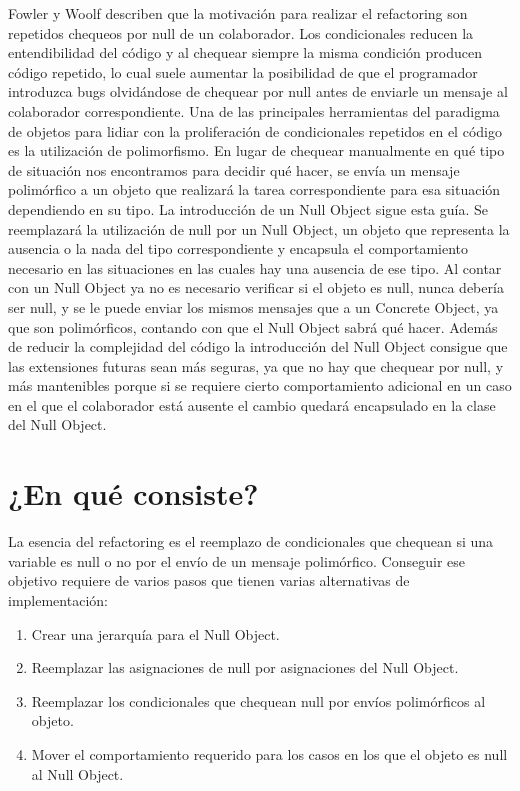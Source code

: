 Fowler y Woolf describen que la motivación para realizar el refactoring son repetidos chequeos por
null de un colaborador. Los condicionales reducen la entendibilidad del código y al chequear siempre
la misma condición producen código repetido, lo cual suele aumentar la posibilidad de que el
programador introduzca bugs olvidándose de chequear por null antes de enviarle un mensaje al
colaborador correspondiente. Una de las principales herramientas del paradigma de objetos para
lidiar con la proliferación de condicionales repetidos en el código es la utilización de
polimorfismo. En lugar de chequear manualmente en qué tipo de situación nos encontramos para decidir
qué hacer, se envía un mensaje polimórfico a un objeto que realizará la tarea correspondiente para
esa situación dependiendo en su tipo. La introducción de un Null Object sigue esta guía. Se
reemplazará la utilización de null por un Null Object, un objeto que representa la ausencia o la
nada del tipo correspondiente y encapsula el comportamiento necesario en las situaciones en las
cuales hay una ausencia de ese tipo. Al contar con un Null Object ya no es necesario verificar si el
objeto es null, nunca debería ser null, y se le puede enviar los mismos mensajes que a un Concrete
Object, ya que son polimórficos, contando con que el Null Object sabrá qué hacer. Además de reducir 
la complejidad del código la introducción del Null Object consigue que las extensiones futuras sean
más seguras, ya que no hay que chequear por null, y más mantenibles porque si se requiere cierto
comportamiento adicional en un caso en el que el colaborador está ausente el cambio quedará
encapsulado en la clase del Null Object.




\section{¿En qué consiste?}

La esencia del refactoring es el reemplazo de condicionales que chequean si una variable es null
o no por el envío de un mensaje polimórfico. Conseguir ese objetivo requiere de varios pasos que tienen
varias alternativas de implementación:

\begin{enumerate}
    \item Crear una jerarquía para el Null Object.
    \item Reemplazar las asignaciones de null por asignaciones del Null Object.
    \item Reemplazar los condicionales que chequean null por envíos polimórficos al objeto.
    \item Mover el comportamiento requerido para los casos en los que el objeto es null al Null
    Object.
\end{enumerate}

